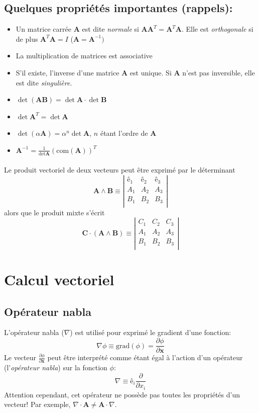 \subsection{Quelques propriétés importantes (rappels): }
\begin{itemize}
\item Un matrice carrée \textbf{A} est dite \emph{normale} si $\textbf{A}\textbf{A}^T=\textbf{A}^T\textbf{A}$. Elle est \emph{orthogonale} si de plus $\textbf{A}^T\textbf{A}=I$ ($\textbf{A}=\textbf{A}^{-1})$
\item La multiplication de matrices est associative
\item S'il existe, l'inverse d'une matrice \textbf{A} est unique. Si \textbf{A} n'est pas inversible, elle est dite \emph{singulière}.
\item $\det(\textbf{AB})=\det\textbf{A}\cdot\det\textbf{B}$
\item $\det \textbf{A}^T=\det\textbf{A}$
\item $\det(\alpha\textbf{A})=\alpha^n\det\textbf{A}$, $n$ étant l'ordre de \textbf{A}
\item $\textbf{A}^{-1}=\frac{1}{\det\textbf{A}}(\text{com}(\textbf{A}))^T$
\end{itemize}
\paragraph*{}
Le produit vectoriel de deux vecteurs peut être exprimé par le déterminant
$$\textbf{A}\wedge\textbf{B}\equiv
\left|\begin{array}{ccc}
\textbf{ê}_1 & \textbf{ê}_2 &\textbf{ê}_3\\
A_1 & A_2 &	 A_3\\
B_1 & B_2 & B_3\\
\end{array}\right|$$
alors que le produit mixte s'écrit
$$\textbf{C}\cdot(\textbf{A}\wedge\textbf{B})\equiv
\left|\begin{array}{ccc}
C_1&C_2&C_3\\
A_1&A_2&A_3\\
B_1&B_2&B_3\\
\end{array}\right|$$

\section{Calcul vectoriel}
\subsection{Opérateur nabla}
L'opérateur nabla ($\nabla$) est utilisé pour exprimé le gradient d'une fonction: $$\nabla\phi\equiv\text{grad}(\phi)=\frac{\partial\phi}{\partial\textbf{x}}$$ Le vecteur $\frac{\partial\phi}{\partial\textbf{x}}$ peut être interprété comme étant égal à l'action d'un opérateur (l'\emph{opérateur nabla}) sur la fonction $\phi$:
$$\nabla\equiv \textbf{ê}_i\frac{\partial}{\partial x_i}$$
Attention cependant, cet opérateur ne possède pas toutes les propriétés d'un vecteur! Par exemple, $\nabla\cdot\textbf{A}\neq\textbf{A}\cdot\nabla$.
